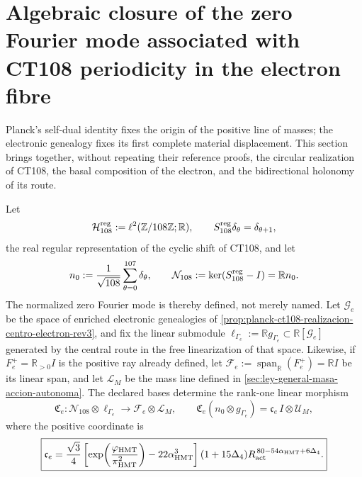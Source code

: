 \section{Algebraic closure of the zero Fourier mode associated with CT108 periodicity in the electron fibre}
\label{sec:clausura-nulo-material-electron-rev3}

Planck's self-dual identity fixes the origin of the positive line of
masses; the electronic genealogy fixes its first complete material
displacement. This section brings together, without repeating their reference proofs,
the circular realization of CT108, the basal composition of the electron, and the
bidirectional holonomy of its route.

Let
\[
 \mathcal H_{108}^{\rm reg}
 :=\ell^2(\mathbb Z/108\mathbb Z;\mathbb R),
 \qquad
 S_{108}^{\rm reg}\delta_\theta=\delta_{\theta+1},
\]
the real regular representation of the cyclic shift of CT108, and let
\[
 n_0:=\frac1{\sqrt{108}}\sum_{\theta=0}^{107}\delta_\theta,
 \qquad
 \mathcal N_{108}:=\ker(S_{108}^{\rm reg}-I)=\mathbb R n_0.
\]
The normalized zero Fourier mode is thereby defined, not merely named.
Let \(\mathcal G_e\) be the space of enriched electronic genealogies of
\cref{prop:planck-ct108-realizacion-centro-electron-rev3}, and fix the
linear submodule
\(\ell_{\Gamma_e}:=\mathbb R g_{\Gamma_e}
\subset\mathbb R[\mathcal G_e]\) generated by the central route in the
free linearization of that space. Likewise, if
\(F_e^+=\mathbb R_{>0}I\) is the positive ray already defined, let
\(\mathcal F_e:=\operatorname{span}_{\mathbb R}(F_e^+)=\mathbb R I\) be its
linear span, and let
\(\mathcal L_M\) be the mass line defined in
\cref{sec:ley-general-masa-accion-autonoma}. The declared bases determine
the rank-one linear morphism
\begin{equation}
 \mathfrak C_e:
 \mathcal N_{108}\otimes\ell_{\Gamma_e}
 \longrightarrow \mathcal F_e\otimes\mathcal L_M,
 \qquad
 \mathfrak C_e(n_0\otimes g_{\Gamma_e})
 =\mathfrak c_e\,I\otimes\mathcal U_M,
 \label{eq:morfismo-clausura-nulo-material-electron-rev3}
\end{equation}
where the positive coordinate is
\begin{equation}
 \boxed{
 \mathfrak c_e=
 \frac{\sqrt3}{4}
 \left[
  \exp\!\left(\frac{\varphi_{\rm HMT}}{\pi_{\rm HMT}^{2}}\right)
  -22\alpha_{\rm HMT}^{3}
 \right]
 (1+15\Delta_4)
 R_{\rm act}^{\,80-54\alpha_{\rm HMT}+6\Delta_4}.}
 \label{eq:coordenada-clausura-nulo-material-electron-rev3}
\end{equation}

